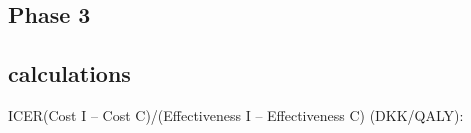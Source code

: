 \subsection{Phase 3}





\subsection{calculations}

ICER(Cost I – Cost C)/(Effectiveness I – Effectiveness C) (DKK/QALY):











